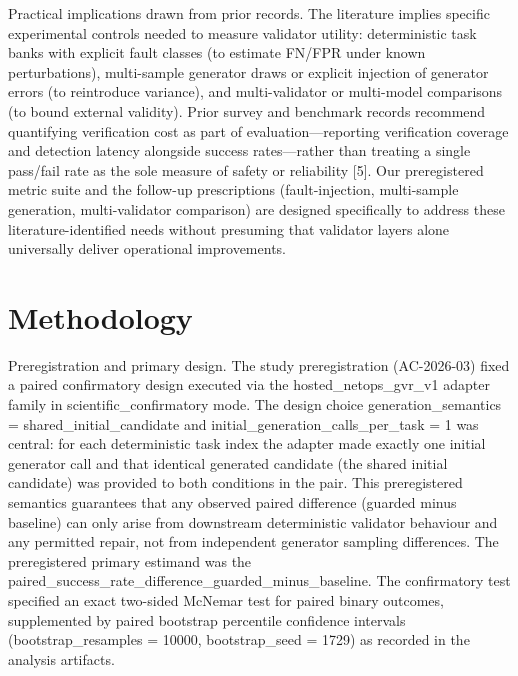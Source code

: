 \documentclass[conference]{IEEEtran}
\begin{document}
Practical implications drawn from prior records. The literature implies specific experimental controls needed to measure validator utility: deterministic task banks with explicit fault classes (to estimate FN/FPR under known perturbations), multi-sample generator draws or explicit injection of generator errors (to reintroduce variance), and multi-validator or multi-model comparisons (to bound external validity). Prior survey and benchmark records recommend quantifying verification cost as part of evaluation---reporting verification coverage and detection latency alongside success rates---rather than treating a single pass/fail rate as the sole measure of safety or reliability [5]. Our preregistered metric suite and the follow-up prescriptions (fault-injection, multi-sample generation, multi-validator comparison) are designed specifically to address these literature-identified needs without presuming that validator layers alone universally deliver operational improvements.

\section{Methodology}
Preregistration and primary design. The study preregistration (AC-2026-03) fixed a paired confirmatory design executed via the hosted\_netops\_gvr\_v1 adapter family in scientific\_confirmatory mode. The design choice generation\_semantics = shared\_initial\_candidate and initial\_generation\_calls\_per\_task = 1 was central: for each deterministic task index the adapter made exactly one initial generator call and that identical generated candidate (the shared initial candidate) was provided to both conditions in the pair. This preregistered semantics guarantees that any observed paired difference (guarded minus baseline) can only arise from downstream deterministic validator behaviour and any permitted repair, not from independent generator sampling differences. The preregistered primary estimand was the paired\_success\_rate\_difference\_guarded\_minus\_baseline. The confirmatory test specified an exact two-sided McNemar test for paired binary outcomes, supplemented by paired bootstrap percentile confidence intervals (bootstrap\_resamples = 10000, bootstrap\_seed = 1729) as recorded in the analysis artifacts.
\end{document}

